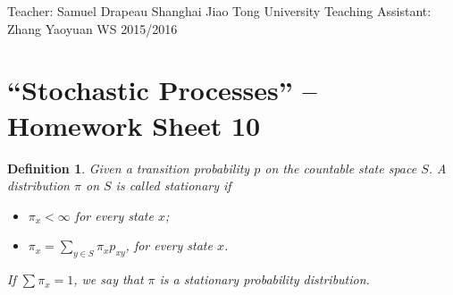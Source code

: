 \documentclass[DIV=classic,a4paper,10pt]{scrartcl}
\newtheorem{definition}[theorem]{Definition}
\theoremstyle{nonumberplain}
\numberwithin{equation}{section}
\begin{document}
\noindent
Teacher: Samuel Drapeau \hfill Shanghai Jiao Tong University \newline
Teaching Assistant: Zhang Yaoyuan \hfill WS 2015/2016

\smallskip
\noindent
\hrulefill

\smallskip

\setcounter{section}{10}

\pagestyle{empty}


\section*{``Stochastic Processes'' -- Homework Sheet 10}
\thispagestyle{empty}




\begin{definition}
    Given a transition probability $p$ on the countable state space $S$.
    A distribution $\pi$ on $S$ is called \emph{stationary} if
    \begin{itemize}
        \item $\pi_x<\infty$ for every state $x$;
        \item $\pi_x=\sum_{y\in S}\pi_xp_{xy}$, for every state $x$.
    \end{itemize}
    If $\sum \pi_x=1$, we say that $\pi$ is a stationary probability distribution.
\end{definition}
\end{document}

